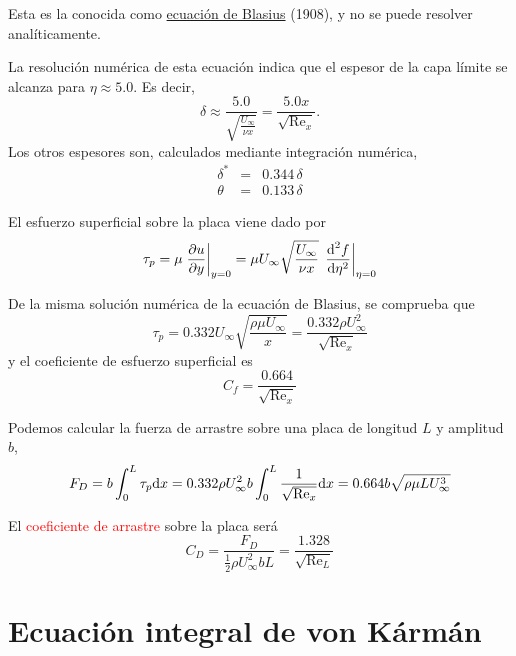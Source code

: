 	Esta es la conocida como \textcolor{red}{\href{https://en.wikipedia.org/wiki/Blasius_boundary_layer}{ecuación de Blasius}}
	(1908), y no se puede resolver analíticamente.

	
	La resolución numérica de esta ecuación indica que el espesor de la
	capa límite se alcanza para $\eta\approx5.0$. Es decir, 
	\[
	\delta\approx\frac{5.0}{\sqrt{\frac{U_{\infty}}{\nu x}}}=\frac{5.0x}{\sqrt{\text{Re}_{x}}}.
	\]
	Los otros espesores son, calculados mediante integración numérica,
	\begin{eqnarray*}
		\delta^{*} & = & 0.344\,\delta\\
		\theta & = & 0.133\,\delta
	\end{eqnarray*}
	
	El esfuerzo superficial sobre la placa viene dado por 
	\[
	\tau_{p}=\mu\left.\frac{\partial u}{\partial y}\right|_{y=0}=\mu U_{\infty}\sqrt{\frac{U_{\infty}}{\nu x}}\,\left.\frac{\text{d}^2 f}{\text{d} \eta^2}\right|_{\eta=0}
	\]
	

	
	De la misma solución numérica de la ecuación de Blasius, se comprueba
	que 
	\[
	\tau_{p}=0.332U_{\infty}\sqrt{\frac{\rho\mu U_{\infty}}{x}}=\frac{0.332\rho U_{\infty}^{2}}{\sqrt{\text{Re}_{x}}}
	\]
	y el coeficiente de esfuerzo superficial es 
	\[
	C_{f}=\frac{0.664}{\sqrt{\text{Re}_{x}}}
	\]
	
	Podemos calcular la fuerza de arrastre sobre una placa de longitud
	$L$ y amplitud $b$, 
	\[
	F_{D}=b\int_{0}^{L}\tau_{p}\text{d} x=0.332\rho U_{\infty}^{2}b\int_{0}^{L}\frac{1}{\sqrt{\text{Re}_{x}}}\text{d} x=0.664b\sqrt{\rho\mu LU_{\infty}^{3}}
	\]
	
	El \textcolor{red}{coeficiente de arrastre} sobre la placa será 
	\[
	C_{D}=\frac{F_{D}}{\frac{1}{2}\rho U_{\infty}^{2}bL}=\frac{1.328}{\sqrt{\text{Re}_{L}}}
	\]
	


\section[Ecuación de von Kármán]{Ecuación integral de von Kármán}

